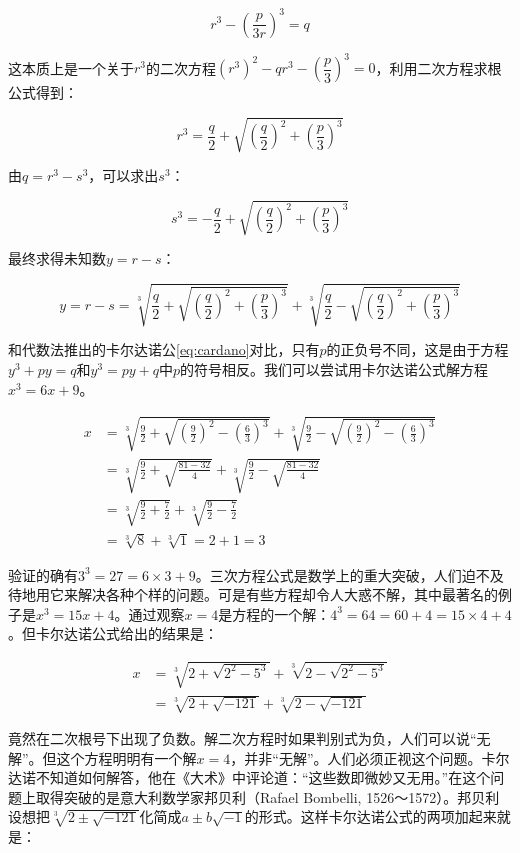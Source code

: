 \documentclass[b5paper]{ctexart}
\begin{document}
\[
r^3 - (\frac{p}{3r})^3 = q
\]

这本质上是一个关于$r^3$的二次方程$(r^3)^2 - qr^3 - (\dfrac{p}{3})^3 = 0$，利用二次方程求根公式得到：

\[
r^3 = \frac{q}{2} + \sqrt{\left(\frac{q}{2}\right)^2 + \left(\frac{p}{3}\right)^3}
\]

由$q = r^3 - s^3$，可以求出$s^3$：

\[
s^3 = -\frac{q}{2} + \sqrt{\left(\dfrac{q}{2}\right)^2 + \left(\dfrac{p}{3}\right)^3}
\]

最终求得未知数$y = r - s$：

\[
y = r - s = \sqrt[3]{\frac{q}{2} + \sqrt{\left(\frac{q}{2}\right)^2 + \left(\frac{p}{3}\right)^3}} + \sqrt[3]{\frac{q}{2} - \sqrt{\left(\frac{q}{2}\right)^2 + \left(\frac{p}{3}\right)^3}}
\]

和代数法推出的卡尔达诺公\cref{eq:cardano}对比，只有$p$的正负号不同，这是由于方程$y^3 + py = q$和$y^3 = py + q$中$p$的符号相反。我们可以尝试用卡尔达诺公式解方程$x^3 = 6x + 9$。

\begin{align*}
x &= \sqrt[3]{\frac{9}{2} + \sqrt{\left(\frac{9}{2}\right)^2 - \left(\frac{6}{3}\right)^3}} + \sqrt[3]{\frac{9}{2} - \sqrt{\left(\frac{9}{2}\right)^2 - \left(\frac{6}{3}\right)^3}} \\
  &= \sqrt[3]{\frac{9}{2} + \sqrt{\frac{81 - 32}{4}}} + \sqrt[3]{\frac{9}{2} - \sqrt{\frac{81 - 32}{4}}} \\
  &= \sqrt[3]{\frac{9}{2} + \frac{7}{2}} + \sqrt[3]{\frac{9}{2} - \frac{7}{2}} \\
  &= \sqrt[3]{8} + \sqrt[3]{1} = 2 + 1 = 3
\end{align*}

验证的确有$3^3 = 27 = 6 \times 3 + 9$。三次方程公式是数学上的重大突破，人们迫不及待地用它来解决各种个样的问题。可是有些方程却令人大惑不解，其中最著名的例子是$x^3 = 15x + 4$。通过观察$x = 4$是方程的一个解：$4^3= 64 = 60 + 4 = 15 \times 4 + 4$。但卡尔达诺公式给出的结果是：

\begin{align*}
x &= \sqrt[3]{2 + \sqrt{2^2 - 5^3}} + \sqrt[3]{2 - \sqrt{2^2 - 5^3}}  \\
  &= \sqrt[3]{2 + \sqrt{-121}} + \sqrt[3]{2 - \sqrt{-121}}
\end{align*}

竟然在二次根号下出现了负数。解二次方程时如果判别式为负，人们可以说“无解”。但这个方程明明有一个解$x = 4$，并非“无解”。人们必须正视这个问题。卡尔达诺不知道如何解答，他在《大术》中评论道：“这些数即微妙又无用。”在这个问题上取得突破的是意大利数学家邦贝利（Rafael Bombelli, 1526～1572）。邦贝利设想把$\sqrt[3]{2 \pm \sqrt{-121}}$化简成$a \pm b\sqrt{-1}$的形式。这样卡尔达诺公式的两项加起来就是：
\end{document}
